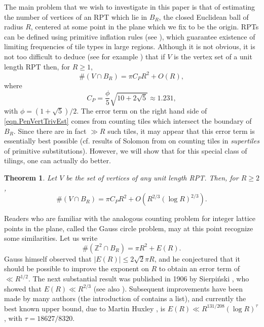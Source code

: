 \documentclass[reqno]{amsart}
\newcommand{\Z}{\mathbb{Z}}
\newtheorem{theorem}{Theorem}
\begin{document}
The main problem that we wish to investigate in this paper is that of estimating the number of vertices of an RPT which lie in $B_R$, the closed Euclidean ball of radius $R$, centered at some point in the plane which we fix to be the origin. RPTs can be defined using primitive inflation rules (see \cite[Section 6.2]{BaakGrim2013}), which guarantee existence of limiting frequencies of tile types in large regions. Although it is not obvious, it is not too difficult to deduce (see for example \cite[Remark 5]{SchmTrev2018}) that if $V$ is the vertex set of a unit length RPT then, for $R\ge 1$,
\begin{equation}\label{eqn.PenVertTrivEst}
	\#(V\cap B_R)=\pi C_P R^2 + O(R),
\end{equation}
where
\[C_P=\frac{\phi}{5}\sqrt{10+2\sqrt{5}}\approx 1.231,\]
with $\phi=(1+\sqrt{5})/2$. The error term on the right hand side of \eqref{eqn.PenVertTrivEst} comes from counting tiles which intersect the boundary of $B_R$.
Since there are in fact $\gg R$ such tiles, it may appear that this error term is essentially best possible (cf. results of Solomon from \cite{Solo2011} on counting tiles in \textit{supertiles} of primitive substitutions). However, we will show that for this special class of tilings, one can actually do better.
\begin{theorem}\label{thm.Pen}
Let $V$ be the set of vertices of any unit length RPT. Then, for $R\ge 2$,
\[\#(V\cap B_R)=\pi C_P R^2 + O(R^{2/3}(\log R)^{2/3}).\]
\end{theorem}
Readers who are familiar with the analogous counting problem for integer lattice points in the plane, called the Gauss circle problem, may at this point recognize some similarities. Let us write
\[\#(\Z^2\cap B_R)=\pi R^2 + E(R).\]
Gauss himself observed that $|E(R)|\le 2\sqrt{2}\pi R$, and he conjectured that it should be possible to improve the exponent on $R$  to obtain an error term of $\ll R^{1/2}$. The next substantial result was published in 1906 by Sierpi\'nski \cite{Sier1906}, who showed that $E(R)\ll R^{2/3}$ (see also \cite{Schi1972}). Subsequent improvements have been made by many authors (the introduction of \cite{Huxl2003} contains a list), and currently the best known upper bound, due to Martin Huxley \cite{Huxl2003}, is $E(R)\ll R^{131/208}(\log R)^\tau$, with $\tau=18627/8320$.
\end{document}
